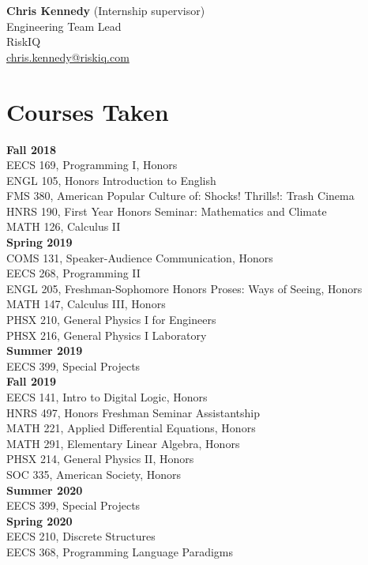 \documentclass[a4paper, 10pt]{article}
\begin{document}
\textbf{Chris Kennedy} (Internship supervisor)\\
Engineering Team Lead\\
RiskIQ\\
\href{mailto:chris.kennedy@riskiq.com}{chris.kennedy@riskiq.com}

\section{Courses Taken}
\textbf{Fall 2018}\\
EECS 169, Programming I, Honors\\
ENGL 105, Honors Introduction to English\\
FMS 380, American Popular Culture of: Shocks! Thrills!: Trash Cinema\\
HNRS 190, First Year Honors Seminar: Mathematics and Climate\\
MATH 126, Calculus II\\
\textbf{Spring 2019}\\
COMS 131, Speaker-Audience Communication, Honors\\
EECS 268, Programming II\\
ENGL 205, Freshman-Sophomore Honors Proses: Ways of Seeing, Honors\\
MATH 147, Calculus III, Honors\\
PHSX 210, General Physics I for Engineers\\
PHSX 216, General Physics I Laboratory\\
\textbf{Summer 2019}\\
EECS 399, Special Projects\\
\textbf{Fall 2019}\\
EECS 141, Intro to Digital Logic, Honors\\
HNRS 497, Honors Freshman Seminar Assistantship\\
MATH 221, Applied Differential Equations, Honors\\
MATH 291, Elementary Linear Algebra, Honors\\
PHSX 214, General Physics II, Honors\\
SOC 335, American Society, Honors\\
\textbf{Summer 2020}\\
EECS 399, Special Projects\\
\textbf{Spring 2020}\\
EECS 210, Discrete Structures\\
EECS 368, Programming Language Paradigms\\
\end{document}
